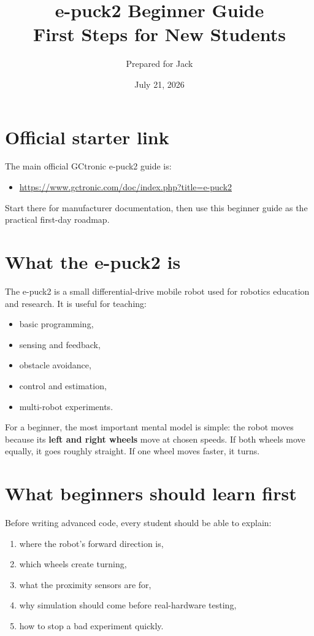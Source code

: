 \documentclass[11pt]{article}
\title{e-puck2 Beginner Guide\\\large First Steps for New Students}
\author{Prepared for Jack}
\date{July 21, 2026}
\begin{document}
\maketitle

\section*{Official starter link}
The main official GCtronic e-puck2 guide is:
\begin{itemize}
  \item \url{https://www.gctronic.com/doc/index.php?title=e-puck2}
\end{itemize}
Start there for manufacturer documentation, then use this beginner guide as the practical first-day roadmap.

\section{What the e-puck2 is}
The e-puck2 is a small differential-drive mobile robot used for robotics education and research. It is useful for teaching:
\begin{itemize}
  \item basic programming,
  \item sensing and feedback,
  \item obstacle avoidance,
  \item control and estimation,
  \item multi-robot experiments.
\end{itemize}

For a beginner, the most important mental model is simple: the robot moves because its \textbf{left and right wheels} move at chosen speeds. If both wheels move equally, it goes roughly straight. If one wheel moves faster, it turns.

\section{What beginners should learn first}
Before writing advanced code, every student should be able to explain:
\begin{enumerate}
  \item where the robot's forward direction is,
  \item which wheels create turning,
  \item what the proximity sensors are for,
  \item why simulation should come before real-hardware testing,
  \item how to stop a bad experiment quickly.
\end{enumerate}
\end{document}

